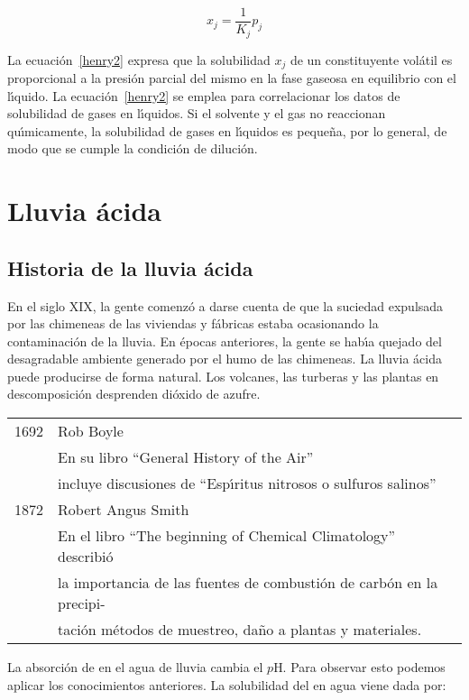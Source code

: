  \begin{equation}
x_j=\frac{1}{K_j}p_j
\label{henry2}
\end{equation}

La ecuaci\'on~\ref{henry2} expresa que la solubilidad $x_j$ de un constituyente vol\'atil es proporcional a la presi\'on parcial del mismo en la fase gaseosa en equilibrio con el l\'{\i}quido. La ecuaci\'on~\ref{henry2} se emplea para correlacionar los datos de solubilidad de gases en l\'{\i}quidos. Si el solvente y el gas no reaccionan qu\'{\i}micamente, la solubilidad de gases en l\'{\i}quidos es peque\~na, por lo general, de modo que se cumple la condici\'on de diluci\'on. 

\section{Lluvia \'acida}

\subsection{Historia de la lluvia \'acida}
En el siglo XIX, la gente comenz\'o a darse cuenta de que la suciedad expulsada por las chimeneas de las viviendas y f\'abricas estaba ocasionando la contaminaci\'on de la lluvia. En \'epocas anteriores, la gente se hab\'{\i}a quejado del desagradable ambiente generado por el humo de las chimeneas. La lluvia \'acida puede producirse de forma natural. Los volcanes, las turberas y las plantas en descomposici\'on desprenden di\'oxido de azufre.

\begin{tabular}{cl}
1692 & Rob Boyle\\
     & En su libro ``General History of the Air''\\
     & incluye discusiones de ``Esp\'{\i}ritus nitrosos o sulfuros salinos''\\
1872 & Robert Angus Smith\\
     & En el libro ``The beginning of Chemical Climatology'' describi\'o \\
     & la importancia de las fuentes de combusti\'on de carb\'on en la precipi-\\
     & ta\-ci\-\'on m\'etodos de muestreo, da\~no a plantas y materiales.
\end{tabular}

La absorci\'on de  en el agua de lluvia cambia el $p$H.  Para observar esto podemos aplicar los conocimientos anteriores. La solubilidad del  en agua viene dada por:

